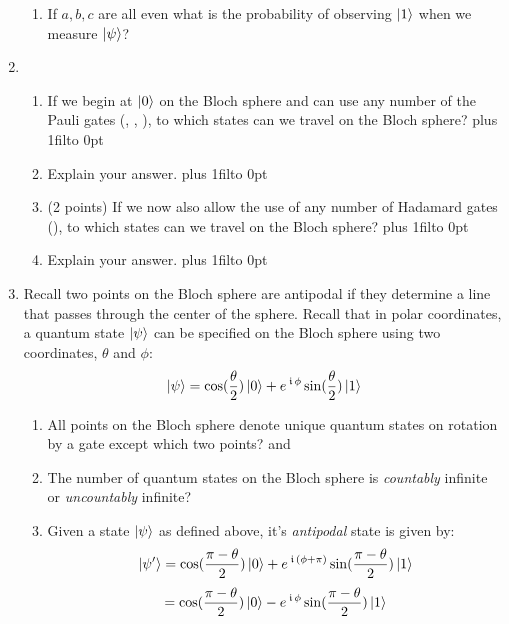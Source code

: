 \documentclass[12pt]{article}
\def\DefaultSpace{1in}
\newcommand{\LeaveSpace}[1][\DefaultSpace]{%
\vskip #1 plus 1fil\relax\hbox to 0pt{\hss} %
}
\begin{document}
\begin{enumerate}[font=\bfseries]
\begin{enumerate}[label=\theenumi.\arabic*]
        \item {} If $a,b,c$ are all even what is the probability of observing $\ket{1}$ when we measure $\ket{\psi}$? \Blank{}
    \end{enumerate}
    \item {}
    \begin{enumerate}[label=\theenumi.\arabic*] \item {} If we begin at $\ket{0}$ on the Bloch sphere and can use any number of the Pauli gates (\PauliX{}, \PauliY{}, \PauliZ{}), to which states can we travel on the Bloch sphere? \LeaveSpace{}
    \item {} Explain your answer. 
    \LeaveSpace{}
    
    \item (2 points) If we now also allow the use of any number of Hadamard gates (\Hadamard{}), to which states can we travel on the Bloch sphere? \LeaveSpace{}
    \item {} Explain your answer. 
    \LeaveSpace{}
    \end{enumerate}
    \item {} Recall two points on the Bloch sphere are antipodal if they determine a line that passes through the center of the sphere. Recall that in polar coordinates, a quantum state $\ket{\psi}$ can be specified on the Bloch sphere using two coordinates, $\theta$ and $\phi$:
    \[\ket{\psi} = \cos(\frac{\theta}{2})\ket{0}
    + e^{\,\kern 0.5pt\mathfrak{i}\,\phi}\sin(\frac{\theta}{2})\ket{1}\]
    \begin{enumerate}[label=\theenumi.\arabic*]
        \item {} All points on the Bloch sphere denote unique quantum states on rotation by a \PauliZ{} gate except which two points? \Blank{} and\Blank{}
        \item {} The number of quantum states on the Bloch sphere is \emph{countably} infinite or \emph{uncountably} infinite? \Blank{}
        \item {} Given a state $\ket{\psi}$ as defined above, it's \emph{antipodal} state is given by:
        \[ \ket{\psi'} = \cos({\frac{\pi - \theta}{2})\ket{0}+e^{\,\kern 0.5pt\mathfrak{i}\,(\phi + \pi)}\sin({\frac{\pi - \theta}{2}})\ket{1}}
        \]
        \[
        = \cos({\frac{\pi - \theta}{2})\ket{0}-e^{\,\kern 0.5pt\mathfrak{i}\,\phi}\sin({\frac{\pi - \theta}{2}})\ket{1}}
        \]
        

\end{enumerate}
\end{enumerate}
\end{document}
